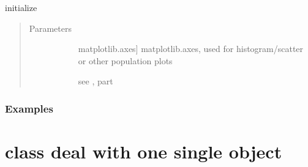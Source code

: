\documentclass[letterpaper,10pt,english]{sphinxmanual}
\begin{document}
\begin{fulllineitems}
\label{\detokenize{generated/sdapy.snerun.snelist.__init__:sdapy.snerun.snelist.__init__}}
initialize 
\begin{quote}\begin{description}
\item[{Parameters}] \leavevmode\begin{description}
\item[{}] \leavevmode{[}matplotlib.axes{]}
matplotlib.axes, used for histogram/scatter or other population plots

\item[{}] \leavevmode{[}\sphinxtitleref{Keyword Arguments}{]}
see ,
 part

\end{description}

\end{description}\end{quote}
\subsubsection*{Examples}

\begin{sphinxVerbatim}[commandchars=\\\{\}]
   
  
\end{sphinxVerbatim}

\end{fulllineitems}



\section{ \textendash{} class deal with one single object}
\label{\detokenize{snobject:snobject-class-deal-with-one-single-object}}\label{\detokenize{snobject:snobject}}\label{\detokenize{snobject::doc}}
\end{document}
